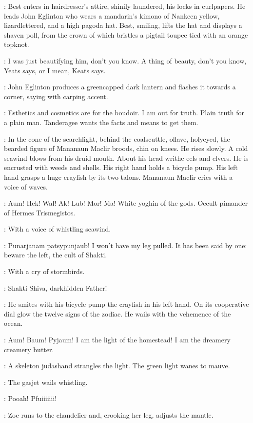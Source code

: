 :
Best enters in hairdresser's attire, shinily laundered, his locks in curlpapers.
He leads John Eglinton who wears a mandarin's kimono of Nankeen yellow,
lizardlettered, and a high pagoda hat.
Best, smiling, lifts the hat and displays a shaven poll,
from the crown of which bristles a pigtail toupee tied with an orange topknot.

\Best:
I was just beautifying him, don't you know.
A thing of beauty, don't you know,
Yeats says, or I mean, Keats says.

:
John Eglinton produces a greencapped dark lantern
and flashes it towards a corner, saying with carping accent.

\JohnEglinton:
Esthetics and cosmetics are for the boudoir.
I am out for truth.
Plain truth for a plain man.
Tanderagee wants the facts and means to get them.%

:
In the cone of the searchlight, behind the coalscuttle,
ollave, holyeyed, the bearded figure of Mananaun Maclir broods, chin on knees.
He rises slowly.
A cold seawind blows from his druid mouth.
About his head writhe eels and elvers.
He is encrusted with weeds and shells.
His right hand holds a bicycle pump.
His left hand grasps a huge crayfish by its two talons.
Mananaun Maclir cries with a voice of waves.

\MananaunMaclir:
Aum! Hek! Wal! Ak! Lub! Mor! Ma!
White yoghin of the gods.
Occult pimander of Hermes Trismegistos.

:
With a voice of whistling seawind.

\MananaunMaclir:
Punarjanam patsypunjaub!
I won't have my leg pulled.
It has been said by one:
beware the left, the cult of Shakti.

:
With a cry of stormbirds.

\MananaunMaclir:
Shakti Shiva, darkhidden Father!

:
He smites with his bicycle pump the crayfish in his left hand.
On its cooperative dial glow the twelve signs of the zodiac.
He wails with the vehemence of the ocean.

\MananaunMaclir:
Aum! Baum! Pyjaum!
I am the light of the homestead!
I am the dreamery creamery butter.

:
A skeleton judashand strangles the light.
The green light wanes to mauve.

:
The gasjet wails whistling.

\Gasjet:
Pooah! Pfuiiiiiii!

:
Zoe runs to the chandelier and, crooking her leg, adjusts the mantle.

